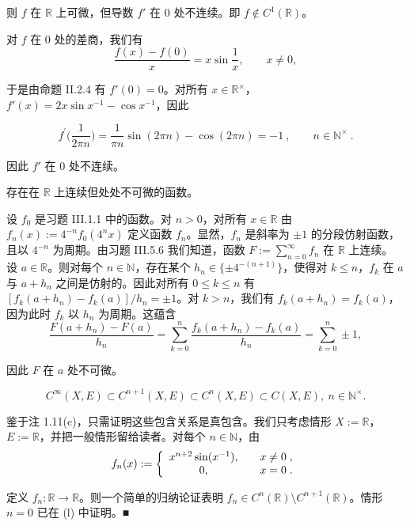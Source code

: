 \begin{example}
则 $f$ 在 $\mathbb{R}$ 上可微，但导数 $f'$ 在 0 处不连续。即 $f \notin C^{1}(\mathbb{R})$。

\proofhead
对 $f$ 在 0 处的差商，我们有
\[
\frac{f(x)-f(0)}{x}=x\sin\frac{1}{x},\qquad x\neq0,
\]

于是由命题 II.2.4 有 $ f'(0) = 0 $。对所有 $ x \in \mathbb{R}^\times $，$ f'(x) = 2x \sin x^{-1} - \cos x^{-1} $，因此

\[
f^{\prime}\Big(\frac{1}{2\pi n}\Big)=\frac{1}{\pi n}\operatorname{s i n}(2\pi n)-\operatorname{c o s}(2\pi n)=-1~,\qquad n\in\mathbb{N}^\times~.
\]

因此 $ f' $ 在 0 处不连续。

\begin{items}
\item[（m）]

存在在 $ \mathbb{R} $ 上连续但处处不可微的函数。

\proofhead
设 $f_0$ 是习题 III.1.1 中的函数。对 $n>0$，对所有 $x\in\mathbb{R}$ 由 $f_n(x):=4^{-n}f_0(4^n x)$ 定义函数 $f_n$。显然，$f_n$ 是斜率为 $\pm1$ 的分段仿射函数，且以 $4^{-n}$ 为周期。由习题 III.5.6 我们知道，函数 $F:=\sum_{n=0}^{\infty}f_n$ 在 $\mathbb{R}$ 上连续。
设 $a \in \mathbb{R}$。则对每个 $n \in \mathbb{N}$，存在某个 $h_n \in \{\pm 4^{-(n+1)}\}$，使得对 $k \leq n$，$f_k$ 在 $a$ 与 $a + h_n$ 之间是仿射的。因此对所有 $0 \leq k \leq n$ 有 $\left[f_k(a + h_n) - f_k(a)\right]/h_n = \pm 1$。对 $k > n$，我们有 $f_k(a + h_n) = f_k(a)$，因为此时 $f_k$ 以 $h_n$ 为周期。这蕴含
\[
\frac{F(a+h_{n})-F(a)}{h_{n}}=\sum_{k=0}^{n}\frac{f_{k}(a+h_{n})-f_{k}(a)}{h_{n}}=\sum_{k=0}^{n}\pm1,
\]

因此 $F$ 在 $a$ 处不可微。

\[
C^{\infty}(X,E)\subset C^{n+1}(X,E)\subset C^{n}(X,E)\subset C(X,E),\ n\in\mathbb{N}^{\times}.
\]

\proofhead
鉴于注 1.11(c)，只需证明这些包含关系是真包含。我们只考虑情形 $X := \mathbb{R}$，$E := \mathbb{R}$，并把一般情形留给读者。对每个 $n \in \mathbb{N}$，由
\begin{equation*}
f_{n}(x):=\left\{\begin{array}{c l}{x^{n+2}\operatorname{s i n}(x^{-1}),}&{\quad x\neq0\;,}\\ {0,}&{\quad x=0\;.}\\ \end{array}\right.
\end{equation*}

定义 $f_n: \mathbb{R} \to \mathbb{R}$。则一个简单的归纳论证表明 $ f_n \in C^n(\mathbb{R}) \setminus C^{n+1}(\mathbb{R}) $。情形 $ n = 0 $ 已在 (l) 中证明。■

\end{items}

\end{example}


